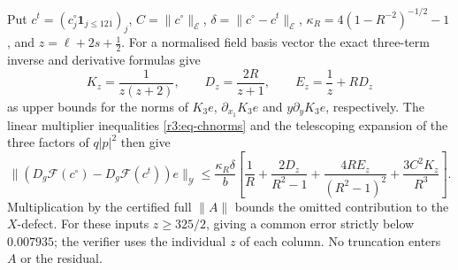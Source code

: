 \documentclass[11pt]{amsart}
\theoremstyle{definition}
\theoremstyle{remark}
\numberwithin{equation}{section}
\newcommand{\Fc}{\mathcal{F}}
\newcommand{\one}{\mathbf{1}}
\newcommand{\nrm}[1]{\lVert #1\rVert}
\begin{document}
Put $c^t=(c_j^\circ\one_{j\leq121})_j$, $C=\nrm{c^\circ}_{\mathcal E}$, $\delta=\nrm{c^\circ-c^t}_{\mathcal E}$, $\kappa_R=4(1-R^{-2})^{-1/2}-1$, and $z=\ell+2s+\frac12$. For a normalised field basis vector the exact three-term inverse and derivative formulas give
\[
K_z=\frac1{z(z+2)},\qquad D_z=\frac{2R}{z+1},\qquad E_z=\frac1z+RD_z
\]
as upper bounds for the norms of $K_3e$, $\partial_{x_1}K_3e$ and $y\partial_yK_3e$, respectively. The linear multiplier inequalities \eqref{r3:eq-chnorms} and the telescoping expansion of the three factors of $q|p|^2$ then give
\[
\nrm{(D_g\Fc(c^\circ)-D_g\Fc(c^t))e}_{\mathcal Y}\leq
\frac{\kappa_R\delta}{b}\left[\frac1R+\frac{2D_z}{R^2-1}+\frac{4RE_z}{(R^2-1)^2}+\frac{3C^2K_z}{R^3}\right].
\]
Multiplication by the certified full $\nrm A$ bounds the omitted contribution to the $X$-defect. For these inputs $z\geq325/2$, giving a common error strictly below $0.007935$; the verifier uses the individual $z$ of each column. No truncation enters $A$ or the residual.
\end{document}
